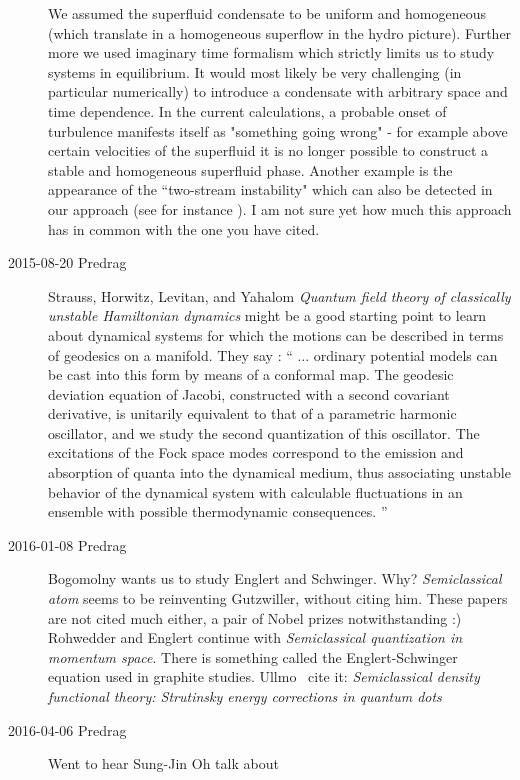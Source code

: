 \begin{description}
We assumed the superfluid condensate to be uniform and homogeneous (which
translate in a homogeneous superflow in the hydro picture). Further more
we used imaginary time formalism which strictly limits us to study
systems in equilibrium. It would most likely be very challenging (in
particular numerically) to introduce a condensate with arbitrary space
and time dependence. In the current calculations, a probable onset of
turbulence manifests itself as "something going wrong" - for example
above certain velocities of the superfluid it is no longer possible to
construct a stable and homogeneous superfluid phase. Another example is
the appearance of the ``two-stream instability" which can also be detected
in our approach (see for instance ).
I am not sure yet how much this approach has in common with the one you
have cited.

\item[2015-08-20 Predrag]
Strauss, Horwitz, Levitan, and Yahalom
{\em Quantum field theory of classically unstable {Hamiltonian} dynamics}
might be a good starting point to learn about dynamical systems for which
the motions can be described in terms of geodesics on a manifold. They
say : ``
... ordinary potential models can be cast into this form by means of a
conformal map. The geodesic deviation equation of Jacobi, constructed
with a second covariant derivative, is unitarily equivalent to that of a
parametric harmonic oscillator, and we study the second quantization of
this oscillator. The excitations of the Fock space modes correspond to
the emission and absorption of quanta into the dynamical medium, thus
associating unstable behavior of the dynamical system with calculable
fluctuations in an ensemble with possible thermodynamic consequences.
''

\item[2016-01-08 Predrag]
Bogomolny wants us to study Englert and
Schwinger. Why?
 {\em Semiclassical atom} seems to be reinventing
Gutzwiller, without citing him. These papers are not cited much either, a
pair of Nobel prizes notwithstanding :) Rohwedder and
Englert continue with {\em Semiclassical quantization in
momentum space}. There is something called the Englert-Schwinger equation
used in graphite studies. Ullmo~\etal{} cite it:
{\em Semiclassical density functional theory: {Strutinsky} energy
corrections in quantum dots}

\item[2016-04-06 Predrag]
Went to hear
{Sung-Jin Oh} talk about


\end{description}
